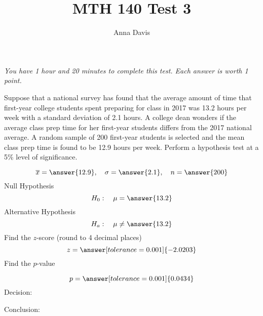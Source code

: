 \documentclass{ximera}
\author{Anna Davis} \title{MTH 140 Test 3}
\begin{document}
\begin{abstract}

\end{abstract}
\maketitle
 \textit{You have 1 hour and 20 minutes to complete this test.  Each answer is worth 1 point.}
\begin{problem}\label{prob:exam3prob1}
Suppose that a national survey has found that the average amount of time that first-year college students spent preparing for class in 2017 was 13.2 hours per week with a standard deviation of 2.1 hours.  A college dean wonders if the average class prep time for her first-year students differs from the 2017 national average.  A random sample of 200 first-year students is selected and the mean class prep time is found to be 12.9 hours per week.  Perform a hypothesis test at a 5\% level of significance.

$$\overline{x}=\answer{12.9},\quad \sigma=\answer{2.1},\quad n=\answer{200}$$
Null Hypothesis
$$H_0:\quad \mu=\answer{13.2}$$
Alternative Hypothesis
$$H_a:\quad \mu\neq\answer{13.2}$$
Find the $z$-score (round to 4 decimal places)
$$z=\answer[tolerance=0.001]{-2.0203}$$
Find the $p$-value
\begin{center}  
\end{center}
$$p=\answer[tolerance=0.001]{0.0434}$$
Decision:

\begin{multipleChoice} 
\end{multipleChoice}  

Conclusion:

\begin{multipleChoice} 
\end{multipleChoice} 

\end{problem}
\end{document}
